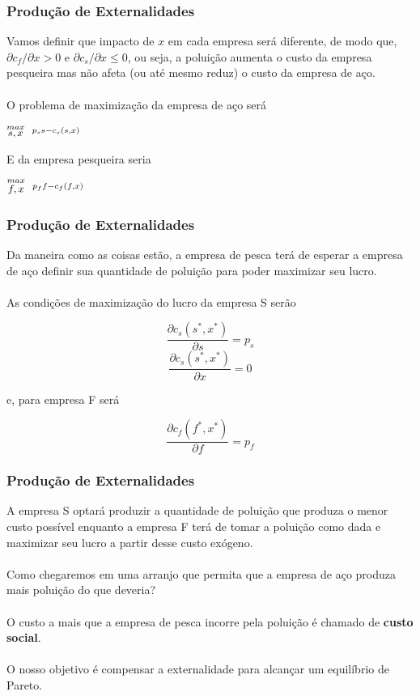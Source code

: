\documentclass{beamer}[10]
\begin{document}
\begin{frame}
	\frametitle{Produção de Externalidades}

	Vamos definir que impacto de $x$ em cada empresa será diferente, de modo que, $\partial c_f/ \partial x > 0$ e $\partial c_s/ \partial x \leq 0$, ou seja, a poluição aumenta o custo da empresa pesqueira mas não afeta (ou até mesmo reduz) o custo da empresa de aço.
	\\~\\
	O problema de maximização da empresa de aço será

	\begin{center}
		\LARGE $ \stackrel{max}{\text{\small $s,x$}} \ \ %
		\stackrel{p_s s - c_s(s,x)}{\ } $ %
	\end{center}

	E da empresa pesqueira seria

	\begin{center}
		\LARGE $ \stackrel{max}{\text{\small $f,x$}} \ \ %
		\stackrel{p_f f - c_f(f,x)}{\ } $ %
	\end{center}

\end{frame}

\begin{frame}
	\frametitle{Produção de Externalidades}

	Da maneira como as coisas estão, a empresa de pesca terá de esperar a empresa de aço definir sua quantidade de poluição para poder maximizar seu lucro.
	\\~\\
	As condições de maximização do lucro da empresa S serão

	$$ \frac{\partial c_s(s^*,x^*)}{\partial s} = p_s $$
	$$ \frac{\partial c_s(s^*,x^*)}{\partial x} = 0 $$

	e, para empresa F será

	$$ \frac{\partial c_f(f^*,x^*)}{\partial f} = p_f $$
	
\end{frame}

\begin{frame}
	\frametitle{Produção de Externalidades}

	A empresa S optará produzir a quantidade de poluição que produza o menor custo possível enquanto a empresa F terá de tomar a poluição como dada e maximizar seu lucro a partir desse custo exógeno.
	\\~\\
	Como chegaremos em uma arranjo que permita que a empresa de aço produza mais poluição do que deveria?
	\\~\\
	O custo a mais que a empresa de pesca incorre pela poluição é chamado de \textbf{custo social}.
	\\~\\
	O nosso objetivo é compensar a externalidade para alcançar um equilíbrio de Pareto.

\end{frame}
\end{document}
